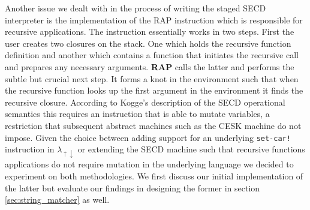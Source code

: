\documentclass[a4paper,12pt,twoside,openright]{report}
\theoremstyle{definition}
\newcommand{\mslang}{$\lambda_{\uparrow\downarrow}$}
\begin{document}
Another issue we dealt with in the process of writing the staged SECD interpreter is the implementation of the RAP instruction which is responsible for recursive applications. The instruction essentially works in two steps. First the user creates two closures on the stack. One which holds the recursive function definition and another which contains a function that initiates the recursive call and prepares any necessary arguments. \textbf{RAP} calls the latter and performs the subtle but crucial next step. It forms a knot in the environment such that when the recursive function looks up the first argument in the environment it finds the recursive closure. According to Kogge's \cite{kogge1990architecture} description of the SECD operational semantics this requires an instruction that is able to mutate variables, a restriction that subsequent abstract machines such as the CESK machine \cite{felleisen1987calculi} do not impose. Given the choice between adding support for an underlying \texttt{set-car!} instruction in \mslang{} or extending the SECD machine such that recursive functions applications do not require mutation in the underlying language we decided to experiment on both methodologies. We first discuss our initial implementation of the latter but evaluate our findings in designing the former in section \ref{sec:string_matcher} as well.




\end{document}
